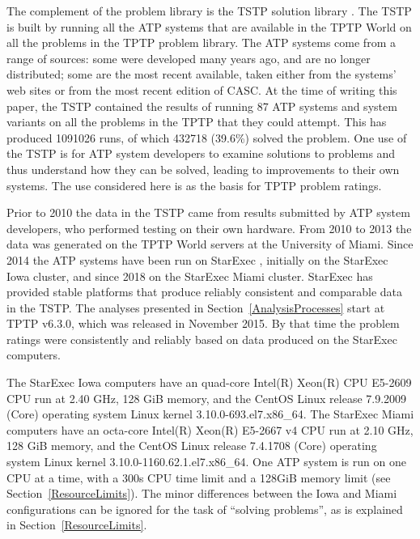 \documentclass[runningheads]{llncs}
\begin{document}
The complement of the problem library is the TSTP solution library \cite{Sut07-CSR,Sut10}.
The TSTP is built by running all the ATP systems that are available in the TPTP World on
all the problems in the TPTP problem library.
The ATP systems come from a range of sources:
some were developed many years ago, and are no longer distributed;
some are the most recent available, taken either from the systems’ web sites or from the most 
recent edition of CASC.
At the time of writing this paper, the TSTP contained the results of running 87 ATP systems and 
system variants on all the problems in the TPTP that they could attempt.
This has produced 1091026 runs, of which 432718 (39.6\%) solved the problem.
One use of the TSTP is for ATP system developers to examine solutions to problems and thus 
understand how they can be solved, leading to improvements to their own systems. 
The use considered here is as the basis for TPTP problem ratings.

Prior to 2010 the data in the TSTP came from results submitted by ATP system developers, who
performed testing on their own hardware.
From 2010 to 2013 the data was generated on the TPTP World servers at the University of Miami.
Since 2014 the ATP systems have been run on StarExec \cite{SST14}, initially on the StarExec
Iowa cluster, and since 2018 on the StarExec Miami cluster.
StarExec has provided stable platforms that produce reliably consistent and comparable data in
the TSTP.
The analyses presented in Section~\ref{AnalysisProcesses} start at TPTP v6.3.0, which was released 
in November 2015. 
By that time the problem ratings were consistently and reliably based on data produced on the 
StarExec computers.

The StarExec Iowa computers have an 
quad-core Intel(R) Xeon(R) CPU E5-2609 CPU run at 2.40 GHz,
128 GiB memory,
and the CentOS Linux release 7.9.2009 (Core) operating system
Linux kernel 3.10.0-693.el7.x86\_64.
The StarExec Miami computers have an
octa-core Intel(R) Xeon(R) E5-2667 v4 CPU run at 2.10 GHz,
128 GiB memory,
and the CentOS Linux release 7.4.1708 (Core) operating system
Linux kernel 3.10.0-1160.62.1.el7.x86\_64.
One ATP system is run on one CPU at a time, with a 300s CPU time limit and a 128GiB memory
limit (see Section~\ref{ResourceLimits}).
The minor differences between the Iowa and Miami configurations can be ignored for the task
of ``solving problems'', as is explained in Section~\ref{ResourceLimits}.
\end{document}
